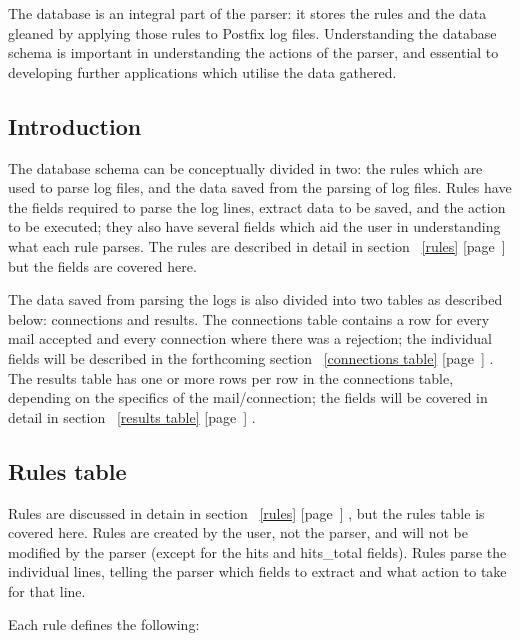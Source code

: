\documentclass[a4paper,12pt,draft]{article}
\newcommand{\refwithpage}[1]{%
    \empty{}\ref{#1} [page~\pageref{#1}]%
}
\begin{document}
The database is an integral part of the parser: it stores the rules and the
data gleaned by applying those rules to Postfix log files.  Understanding
the database schema is important in understanding the actions of the
parser, and essential to developing further applications which utilise the
data gathered.

\subsection{Introduction}

The database schema can be conceptually divided in two: the rules which are
used to parse log files, and the data saved from the parsing of log files.
Rules have the fields required to parse the log lines, extract data to be
saved, and the action to be executed; they also have several fields which
aid the user in understanding what each rule parses.  The rules are
described in detail in section~\refwithpage{rules} but the fields are
covered here.

The data saved from parsing the logs is also divided into two tables as
described below: connections and results.  The connections table contains a
row for every mail accepted and every connection where there was a
rejection; the individual fields will be described in the forthcoming
section~\refwithpage{connections table}.  The results table has one or more
rows per row in the connections table, depending on the specifics of the
mail/connection; the fields will be covered in detail in
section~\refwithpage{results table}.

\subsection{Rules table}

\label{rule attributes}

Rules are discussed in detain in section~\refwithpage{rules}, but the rules
table is covered here.  Rules are created by the user, not the parser, and
will not be modified by the parser (except for the hits and hits\_total
fields).  Rules parse the individual lines, telling the parser which fields
to extract and what action to take for that line.

Each rule defines the following:
\end{document}
